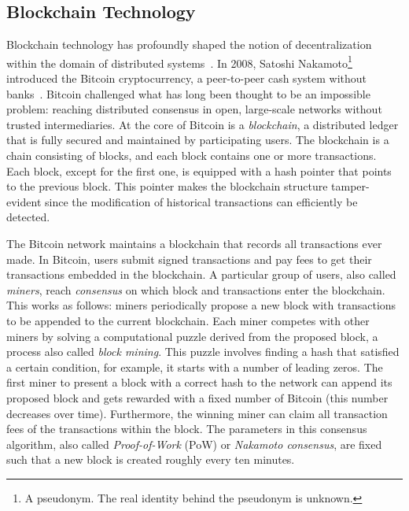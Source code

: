 \subsection{Blockchain Technology}
Blockchain technology has profoundly shaped the notion of decentralization within the domain of distributed systems~\cite{aste2017blockchain}.
In 2008, Satoshi Nakamoto\footnote{A pseudonym. The real identity behind the pseudonym is unknown.} introduced the Bitcoin cryptocurrency, a peer-to-peer cash system without banks~\cite{nakamoto2008bitcoin}.
Bitcoin challenged what has long been thought to be an impossible problem: reaching distributed consensus in open, large-scale networks without trusted intermediaries.
At the core of Bitcoin is a \emph{blockchain}, a distributed ledger that is fully secured and maintained by participating users.
The blockchain is a chain consisting of blocks, and each block contains one or more transactions.
Each block, except for the first one, is equipped with a hash pointer that points to the previous block.
This pointer makes the blockchain structure tamper-evident since the modification of historical transactions can efficiently be detected.

The Bitcoin network maintains a blockchain that records all transactions ever made.
In Bitcoin, users submit signed transactions and pay fees to get their transactions embedded in the blockchain.
A particular group of users, also called \emph{miners}, reach \emph{consensus} on which block and transactions enter the blockchain.
This works as follows: miners periodically propose a new block with transactions to be appended to the current blockchain.
Each miner competes with other miners by solving a computational puzzle derived from the proposed block, a process also called \emph{block mining}.
This puzzle involves finding a hash that satisfied a certain condition, for example, it starts with a number of leading zeros.
The first miner to present a block with a correct hash to the network can append its proposed block and gets rewarded with a fixed number of Bitcoin (this number decreases over time).
Furthermore, the winning miner can claim all transaction fees of the transactions within the block.
The parameters in this consensus algorithm, also called \emph{Proof-of-Work} (PoW) or \emph{Nakamoto consensus}, are fixed such that a new block is created roughly every ten minutes.

